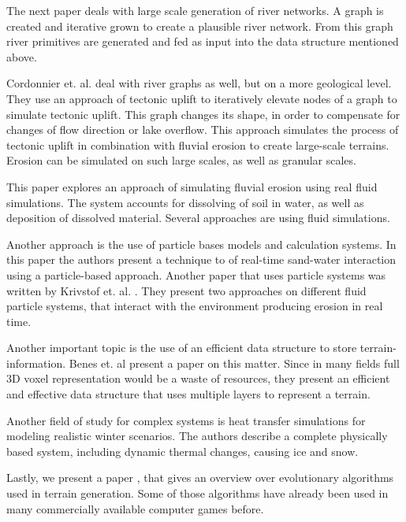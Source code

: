 The next paper \cite{Genevaux:2013:TGU:2461912.2461996} deals with large scale generation of river networks. A graph is created and iterative grown to create a plausible river network. From this graph river primitives are generated and fed as input into the data structure mentioned above. 

Cordonnier et. al. \cite{cordonnier2016large}  deal with river graphs as well, but on a more geological level. They use an approach of tectonic uplift to iteratively elevate nodes of a graph to simulate tectonic uplift. This graph changes its shape, in order to compensate for changes of flow direction or lake overflow. This approach simulates the process of tectonic uplift in combination with fluvial erosion to create large-scale terrains. Erosion can be simulated on such large scales, as well as granular scales. 

This paper \cite{Neidhold:2005:IPB:2381356.2381361} explores an approach of simulating fluvial erosion using real fluid simulations. The system accounts for dissolving of soil in water, as well as deposition of dissolved material. Several approaches are using fluid simulations. 

Another approach is the use of particle bases models and calculation systems. In this paper \cite{rungjiratananon2008real} the authors present a technique to of real-time sand-water interaction using a particle-based approach. Another paper that uses particle systems was written by Krivstof et. al. \cite{krivstof2009hydraulic}. They present two approaches on different fluid particle systems, that interact with the environment producing erosion in real time. 

Another important topic is the use of an efficient data structure to store terrain-information. Benes et. al \cite{benes2001layered} present a paper on this matter. Since in many fields full 3D voxel representation would be a waste of resources, they present an efficient and effective data structure that uses multiple layers to represent a terrain. 

Another field of study for complex systems is heat transfer simulations for modeling realistic winter scenarios\cite{marechal2010heat}. The authors describe a complete physically based system, including dynamic thermal changes, causing ice and snow.

Lastly, we present a paper \cite{raffe2012survey}, that gives an overview over evolutionary algorithms used in terrain generation. Some of those algorithms have already been used in many commercially available computer games before.
